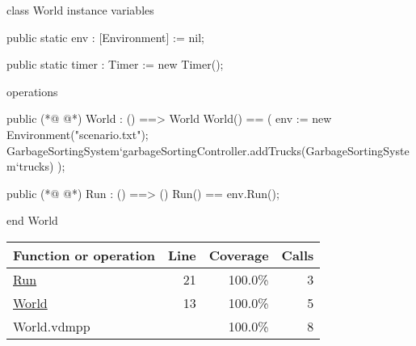 \begin{vdmpp}[breaklines=true]
class World
instance variables  

public static
  env : [Environment] := nil;

public static 
  timer : Timer := new Timer();
   
operations

public 
(*@
\label{World:13}
@*)
  World : () ==> World
  World() ==
  (
    env := new Environment("scenario.txt");
    GarbageSortingSystem`garbageSortingController.addTrucks(GarbageSortingSystem`trucks)
  );
  
public 
(*@
\label{Run:21}
@*)
  Run : () ==> ()
  Run() ==
    env.Run();

end World
\end{vdmpp}
\bigskip
\begin{longtable}{|l|r|r|r|}
\hline
Function or operation & Line & Coverage & Calls \\
\hline
\hline
\hyperref[Run:21]{Run} & 21&100.0\% & 3 \\
\hline
\hyperref[World:13]{World} & 13&100.0\% & 5 \\
\hline
\hline
World.vdmpp & & 100.0\% & 8 \\
\hline
\end{longtable}

